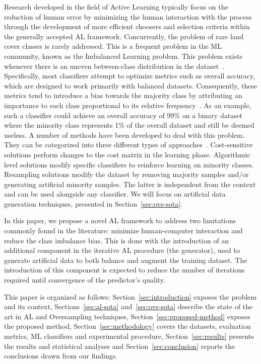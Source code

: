 \documentclass[parskip=full]{scrartcl}
\begin{document}
Research developed in the field of Active Learning typically focus on the
reduction of human error by minimizing the human interaction with the process
through the development of more efficient choosers and selection criteria
within the generally accepted AL framework.  Concurrently, the problem of rare
land cover classes is rarely addressed. This is a frequent problem in the ML
community, known as the Imbalanced Learning problem. This problem exists
whenever there is an uneven between-class distribution in the
dataset~\cite{Chawla2004}. Specifically, most classifiers attempt to optimize
metrics such as overall accuracy, which are designed to work primarily with
balanced datasets. Consequently, these metrics tend to introduce a bias towards
the majority class by attributing an importance to each class proportional to
its relative frequency~\cite{Maxwell2018}. As an example, such a classifier
could achieve an overall accuracy of 99\% on a binary dataset where the
minority class represents 1\% of the overall dataset and still be deemed
useless. A number of methods have been developed to deal with this problem.
They can be categorized into three different types of
approaches~\cite{Fernandez2013,Kaur2019}. Cost-sensitive solutions perform
changes to the cost matrix in the learning phase. Algorithmic level solutions
modify specific classifiers to reinforce learning on minority classes.
Resampling solutions modify the dataset by removing majority samples and/or
generating artificial minority samples. The latter is independent from the
context and can be used alongside any classifier. We will focus on artificial
data generation techniques, presented in Section~\ref{sec:ovs-sota}.

In this paper, we propose a novel AL framework to address two limitations
commonly found in the literature: minimize human-computer interaction and
reduce the class imbalance bias. This is done with the introduction of an
additional component in the iterative AL procedure (the generator), used to
generate artificial data to both balance and augment the training dataset. The
introduction of this component is expected to reduce the number of iterations
required until convergence of the predictor's quality.

This paper is organized as follows: Section~\ref{sec:introduction} exposes the
problem and its context, Sections~\ref{sec:al-sota} and~\ref{sec:ovs-sota}
describe the state of the art in AL and Oversampling techniques,
Section~\ref{sec:proposed-method} exposes the proposed method,
Section~\ref{sec:methodology} covers the datasets, evaluation metrics, ML
classifiers and experimental procedure, Section~\ref{sec:results} presents the
results and statistical analyses and Section~\ref{sec:conclusion} reports the
conclusions drawn from our findings.
\end{document}
